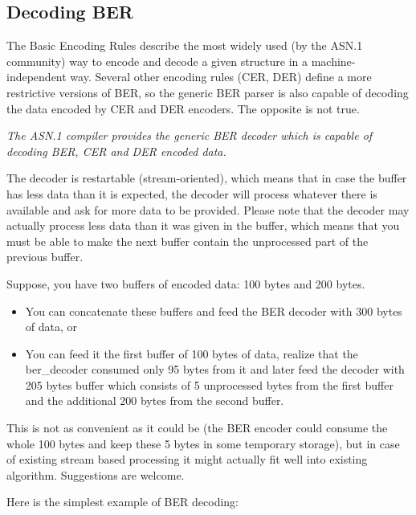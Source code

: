 \documentclass[english,oneside,12pt]{book}
\begin{document}
\subsection{\label{sub:Decoding-BER}Decoding BER}

The Basic Encoding Rules describe the most widely used (by the ASN.1
community) way to encode and decode a given structure in a machine-independent
way. Several other encoding rules (CER, DER) define a more restrictive
versions of BER, so the generic BER parser is also capable of decoding
the data encoded by CER and DER encoders. The opposite is not true.

\emph{The ASN.1 compiler provides the generic BER decoder which is
capable of decoding BER, CER and DER encoded data.}

The decoder is restartable (stream-oriented), which means that in
case the buffer has less data than it is expected, the decoder will
process whatever there is available and ask for more data to be provided.
Please note that the decoder may actually process less data than it
was given in the buffer, which means that you must be able to make
the next buffer contain the unprocessed part of the previous buffer.

Suppose, you have two buffers of encoded data: 100 bytes and 200 bytes.
\begin{itemize}
\item You can concatenate these buffers and feed the BER decoder with 300
bytes of data, or
\item You can feed it the first buffer of 100 bytes of data, realize that
the ber\_decoder consumed only 95 bytes from it and later feed the
decoder with 205 bytes buffer which consists of 5 unprocessed bytes
from the first buffer and the additional 200 bytes from the second
buffer.
\end{itemize}
This is not as convenient as it could be (the BER encoder could
consume the whole 100 bytes and keep these 5 bytes in some temporary
storage), but in case of existing stream based processing it might
actually fit well into existing algorithm. Suggestions are welcome.

Here is the simplest example of BER decoding:
\end{document}
